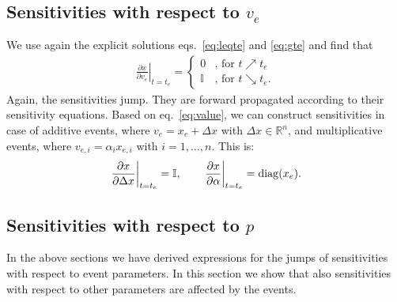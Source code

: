\documentclass[journal, a4paper]{IEEEtran}
\begin{document}
\subsection{Sensitivities with respect to $v_e$}

We use again the explicit solutions eqs.~\eqref{eq:leqte} and \eqref{eq:gte} and find that
\begin{align}
    \left.\frac{\partial x}{\partial v_e}\right|_{t = t_e} =
    \left\{
    \begin{array}{ll}
    0     & \textrm{, for } t\nearrow t_e \\
    \mathbb I     & \textrm{, for }t \searrow t_e.
    \end{array}
    \right.
    \label{eq:value}
\end{align}
Again, the sensitivities jump. They are forward propagated according to their sensitivity equations. Based on eq.~\eqref{eq:value}, we can construct sensitivities in case of additive events, where $v_e = x_e + \Delta x$ with $\Delta x \in \mathbb R^n$, and multiplicative events, where $v_{e, i} = \alpha_i x_{e, i}$ with $i = 1, \dots, n$. This is:
\begin{align}
    \left.\frac{\partial x}{\partial \Delta x}\right|_{t = t_e} = \mathbb I, \qquad \left.\frac{\partial x}{\partial \alpha}\right|_{t = t_e} = {\rm diag}(x_e).
\end{align}

\subsection{Sensitivities with respect to $p$}


In the above sections we have derived expressions for the jumps of sensitivities with respect to event parameters. In this section we show that also sensitivities with respect to other parameters are affected by the events.
\end{document}
